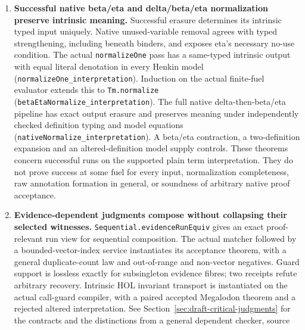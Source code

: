 \documentclass[11pt]{article}
\theoremstyle{definition}
\theoremstyle{remark}
\begin{document}
\begin{enumerate}
  native beta redex and its native contractum are exact erasures of intrinsic
  terms with equal denotations in every Henkin model, at every valuation
  (\nolinkurl{HenkinTermInterpretation.native_beta_interpretation}). Neither
  full domains nor extensional argument congruence is needed for this local
  beta law. A nested-binder control distinguishes the correctly shifted
  contractum from variable capture. General native normalization and arbitrary
  proof acceptance are not consequences of this local theorem. Checked delta
  interpretation is established separately below.
\item \textbf{Successful native beta/eta and delta/beta/eta normalization
  preserve intrinsic meaning.} Successful erasure determines its intrinsic
  typed input uniquely. Native unused-variable removal agrees with typed
  strengthening, including beneath binders, and exposes eta's necessary
  no-use condition. The actual \nolinkurl{normalizeOne} pass has a
  same-typed intrinsic output with equal literal denotation in every Henkin
  model (\nolinkurl{normalizeOne_interpretation}). Induction on the actual
  finite-fuel evaluator extends this to \nolinkurl{Tm.normalize}
  (\nolinkurl{betaEtaNormalize_interpretation}). The full native
  delta-then-beta/eta pipeline has exact output erasure and preserves meaning
  under independently checked definition typing and model equations
  (\nolinkurl{nativeNormalize_interpretation}). A beta/eta contraction, a
  two-definition expansion and an altered-definition model supply controls.
  These theorems concern successful runs on the supported plain term
  interpretation. They do not prove success at some fuel for every input,
  normalization completeness, raw annotation formation in general, or
  soundness of arbitrary native proof acceptance.
\item \textbf{Evidence-dependent judgments compose without collapsing
  their selected witnesses.} \nolinkurl{Sequential.evidenceRunEquiv} gives
  an exact proof-relevant run view for sequential composition. The actual
  matcher followed by a bounded-vector-index service instantiates its
  acceptance theorem, with a general duplicate-count law and out-of-range
  and non-vector negatives. Guard support is lossless exactly for
  subsingleton evidence fibres; two receipts refute arbitrary recovery.
  Intrinsic HOL invariant transport is instantiated on the actual call-guard
  compiler, with a paired accepted Megalodon theorem and a rejected altered
  interpretation. See Section~\ref{sec:draft-critical-judgments} for the
  contracts and the distinctions from a general dependent checker, source

\end{enumerate}
\end{document}

